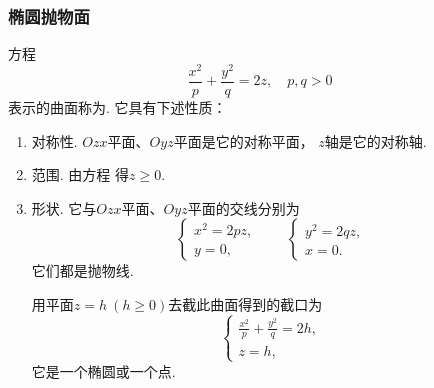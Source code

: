 \subsubsection{椭圆抛物面}
方程\begin{equation}\label{equation:解析几何.椭圆抛物面的一般方程}
	\frac{x^2}{p}+\frac{y^2}{q}=2z,
	\quad p,q>0
\end{equation}
表示的曲面称为.
它具有下述性质：
\begin{enumerate}
	\item 对称性.
	\(Ozx\)平面、\(Oyz\)平面是它的对称平面，
	\(z\)轴是它的对称轴.

	\item 范围.
	由方程  得\(z \geqslant 0\).

	\item 形状.
	它与\(Ozx\)平面、\(Oyz\)平面的交线分别为\[
		\left\{ \begin{array}{l}
			x^2 = 2pz, \\
			y = 0,
		\end{array} \right.
		\qquad
		\left\{ \begin{array}{l}
			y^2 = 2qz, \\
			x = 0.
		\end{array} \right.
	\]
	它们都是抛物线.

	用平面\(z = h\ (h\geqslant0)\)去截此曲面得到的截口为\[
		\left\{ \begin{array}{l}
			\frac{x^2}{p} + \frac{y^2}{q} = 2h, \\
			z = h,
		\end{array} \right.
	\]
	它是一个椭圆或一个点.
\end{enumerate}

